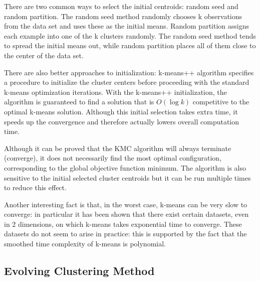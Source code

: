 \documentclass[conference]{IEEEtran}
\begin{document}

There are two common ways to select the initial centroids: random seed and random partition.
The random seed method randomly chooses k observations from the data set
and uses these as the initial means. Random partition
assigns each example into one of the k clusters randomly.
The random seed method tends to spread the initial means out, while random partition
places all of them close to the center of the data set.

There are also better approaches to initialization: k-means++ algorithm specifies a
procedure to initialize the cluster centers before proceeding with the standard k-means
optimization iterations. With the k-means++ initialization, the algorithm is guaranteed
to find a solution that is $O(\log k)$ competitive to the optimal k-means solution.
Although this initial selection takes extra time, it speeds up the convergence and 
therefore actually lowers overall computation time.

Although it can be proved that the KMC algorithm will always terminate (converge),
it does not necessarily find the most optimal configuration,
corresponding to the global objective function minimum. The algorithm is also sensitive
to the initial selected cluster centroids but it can be run multiple times to reduce this effect.

Another interesting fact is that, in the worst case, k-means can be very slow to converge:
in particular it has been shown that there exist certain datasets,
even in 2 dimensions, on which k-means takes exponential time to converge.
These datasets do not seem to arise in practice: this is supported by the
fact that the smoothed time complexity of k-means is polynomial.

\subsection{Evolving Clustering Method}
\end{document}
